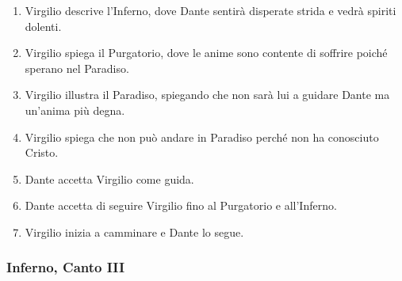 \documentclass{article}
\begin{document}
\begin{enumerate}
    \item Virgilio descrive l'Inferno, dove Dante sentirà disperate strida e vedrà spiriti dolenti.
    \item Virgilio spiega il Purgatorio, dove le anime sono contente di soffrire poiché sperano nel Paradiso.
    \item Virgilio illustra il Paradiso, spiegando che non sarà lui a guidare Dante ma un'anima più degna.
    \item Virgilio spiega che non può andare in Paradiso perché non ha conosciuto Cristo.
    \item Dante accetta Virgilio come guida.
    \item Dante accetta di seguire Virgilio fino al Purgatorio e all'Inferno.
    \item Virgilio inizia a camminare e Dante lo segue.
\end{enumerate}

\newpage
\subsubsection{Inferno, Canto III}
\end{document}
